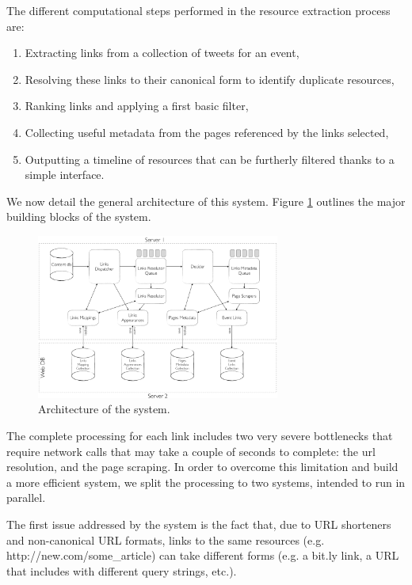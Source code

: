 \documentclass{sig-alternate}
\begin{document}

The different computational steps performed in the resource extraction process are:
\begin{enumerate}
 \item Extracting links from a collection of tweets for an event,
 \item Resolving these links to their canonical form to identify duplicate resources,
 \item Ranking links and applying a first basic filter,
 \item Collecting useful metadata from the pages referenced by the links selected,
 \item Outputting a timeline of resources that can be furtherly filtered thanks to a simple interface.
\end{enumerate}

We now detail the general architecture of this system. Figure \ref{fig:architecture} outlines the major building blocks of the system.
\begin{figure}[htbp]
  \centering
  \includegraphics[width=8cm]{Figures/links_processing_architecture.png}
  \caption{Architecture of the system.}
  \label{fig:architecture}
\end{figure}

The complete processing for each link includes two very severe bottlenecks that require network calls that may take a couple of seconds to complete: the url resolution, and the page scraping. In order to overcome this limitation and build a more efficient system, we split the processing to two systems, intended to run in parallel.

The first issue addressed by the system is the fact that, due to URL shorteners and non-canonical URL formats, links to the same resources (e.g. http://new.com/some\_article) can take different forms (e.g. a bit.ly link, a URL that includes with different query strings, etc.).  
\end{document}
